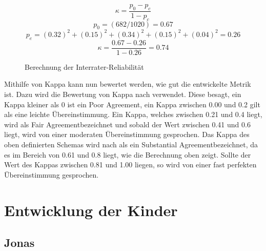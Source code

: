  \begin{figure}[H]
 	\centering
 	\begin{equation}
 		\kappa = \frac{p_{0} - p_{c}}{1 - p_{c}}
 	\end{equation}
 	\begin{equation}
 		p_{0} = (682/1020) = 0.67
 	\end{equation}
 	\begin{equation}
 		p_{e} = (0.32)^{2} + (0.15)^{2} + (0.34)^{2} + (0.15)^{2} + (0.04)^{2} =  0.26
 	\end{equation}
 	\begin{equation}
 		\kappa = \frac{0.67 - 0.26}{1 - 0.26} = 0.74
 	\end{equation}
 	\caption{Berechnung der Interrater-Reliabilität}
 	\label{img:calc}
 \end{figure}

Mithilfe von Kappa kann nun bewertet werden, wie gut die entwickelte Metrik ist. Dazu wird die Bewertung von Kappa nach \citeauthor{Landis77} verwendet. Diese besagt, ein Kappa kleiner als 0 ist ein \glqq Poor Agreement\grqq, ein Kappa zwischen 0.00 und 0.2 gilt als eine leichte Übereinstimmung. Ein Kappa, welches zwischen 0.21 und 0.4 liegt, wird als \glqq Fair Agreement\grqq bezeichnet und sobald der Wert zwischen 0.41 und 0.6 liegt, wird von einer moderaten Übereinstimmung gesprochen. Das Kappa des oben definierten Schemas wird nach \citeauthor{Landis77} als ein \glqq Substantial Agreement\grqq bezeichnet, da es im Bereich von 0.61 und 0.8 liegt, wie die Berechnung oben zeigt. Sollte der Wert des Kappas zwischen 0.81 und 1.00 liegen, so wird von einer fast perfekten Übereinstimmung gesprochen.\\
\noindent
\cite{Landis77}

\section{Entwicklung der Kinder}
\subsection*{Jonas}

